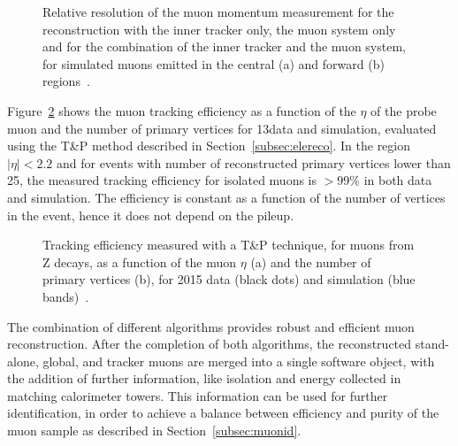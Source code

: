 \begin{figure}[!htb]
\centering
{}\quad\quad\quad
{}
\caption{Relative resolution of the muon momentum measurement for the reconstruction with the inner tracker only, the muon system only and for the combination of the inner tracker and the muon system, for simulated muons emitted in the central (a) and forward (b) regions~\cite{Bayatian:922757}.}
\label{fig:mu_ptrel}
\end{figure}

Figure~\ref{fig:mu_reco_eff} shows the muon tracking efficiency as a function of the $\eta$ of the probe muon and the number of primary vertices for 13\TeV data and simulation, evaluated using the T\&P method described in Section~\ref{subsec:elereco}. In the region $|\eta| < 2.2$ and for events with number of reconstructed primary vertices lower than 25, the measured tracking efficiency for isolated muons is $> 99\%$ in both data and simulation. The efficiency is constant as a function of the number of vertices in the event, hence it does not depend on the pileup.\\

\begin{figure}[!htb]
\centering
{}
\caption{Tracking efficiency measured with a T\&P technique, for muons from Z decays, as a function of the muon $\eta$ (a) and the number of primary vertices (b), for 2015 data (black dots) and simulation (blue bands)~\cite{CMS-DP-2015-016}.}
\label{fig:mu_reco_eff}
\end{figure}

The combination of different algorithms provides robust and efficient muon reconstruction.
After the completion of both algorithms, the reconstructed stand-alone, global, and tracker muons are merged into a single software object, with the addition of further information, like isolation and energy collected in matching calorimeter towers. This information can be used for further identification, in order to achieve a balance between efficiency and purity of the muon sample as described in Section~\ref{subsec:muonid}.\\

